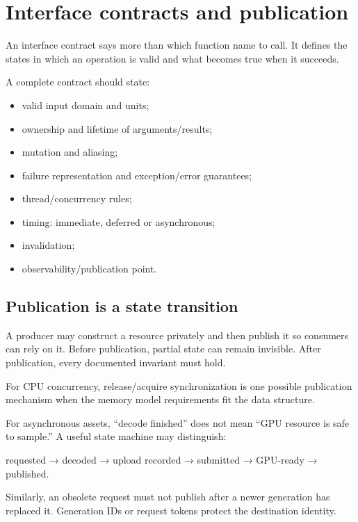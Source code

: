 \hypertarget{appendix-fdae7ff0a23f}{}
\section{Interface contracts and publication}\label{appendix-fdae7ff0a23f-interface-contracts-and-publication}

An interface contract says more than which function name to call. It defines the states in which an operation is valid and what becomes true when it succeeds.

A complete contract should state:

\begin{itemize}
\tightlist
\item
  valid input domain and units;
\item
  ownership and lifetime of arguments/results;
\item
  mutation and aliasing;
\item
  failure representation and exception/error guarantees;
\item
  thread/concurrency rules;
\item
  timing: immediate, deferred or asynchronous;
\item
  invalidation;
\item
  observability/publication point.
\end{itemize}

\subsection{Publication is a state transition}\label{appendix-fdae7ff0a23f-publication-is-a-state-transition}

A producer may construct a resource privately and then publish it so consumers can rely on it. Before publication, partial state can remain invisible. After publication, every documented invariant must hold.

For CPU concurrency, release/acquire synchronization is one possible publication mechanism when the memory model requirements fit the data structure.

For asynchronous assets, ``decode finished'' does not mean ``GPU resource is safe to sample.'' A useful state machine may distinguish:

requested → decoded → upload recorded → submitted → GPU-ready → published.

Similarly, an obsolete request must not publish after a newer generation has replaced it. Generation IDs or request tokens protect the destination identity.

